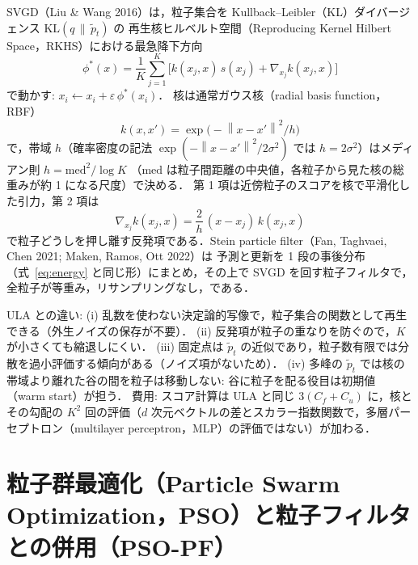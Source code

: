 \documentclass[a4paper,11pt]{article}
\newcommand{\ptil}{\tilde p_t}
\newcommand{\nrm}[1]{\left\lVert #1 \right\rVert}
\begin{document}
SVGD（Liu \& Wang 2016）は，粒子集合を Kullback--Leibler（KL）ダイバージェンス $\mathrm{KL}(q \,\|\, \ptil)$ の
再生核ヒルベルト空間（Reproducing Kernel Hilbert Space，RKHS）における最急降下方向
\begin{equation}
  \phi^*(x) = \frac1K \sum_{j=1}^K \Big[ k(x_j, x)\, s(x_j) + \nabla_{x_j} k(x_j, x) \Big]
  \label{eq:svgd}
\end{equation}
で動かす: $x_i \leftarrow x_i + \varepsilon\, \phi^*(x_i)$．
核は通常ガウス核（radial basis function，RBF）
\begin{equation}
  k(x, x') = \exp\!\big(-\nrm{x - x'}^2 / h\big)
\end{equation}
で，帯域 $h$（確率密度の記法 $\exp(-\nrm{x-x'}^2/2\sigma^2)$ では $h = 2\sigma^2$）はメディアン則 $h = \mathrm{med}^2 / \log K$
（$\mathrm{med}$ は粒子間距離の中央値，各粒子から見た核の総重みが約 1 になる尺度）で決める．
第 1 項は近傍粒子のスコアを核で平滑化した引力，第 2 項は
\begin{equation}
  \nabla_{x_j} k(x_j, x) = \frac{2}{h}\,(x - x_j)\, k(x_j, x)
\end{equation}
で粒子どうしを押し離す反発項である．Stein particle filter（Fan, Taghvaei, Chen 2021; Maken, Ramos, Ott 2022）は
予測と更新を 1 段の事後分布（式~\eqref{eq:energy} と同じ形）にまとめ，その上で SVGD を回す粒子フィルタで，
全粒子が等重み，リサンプリングなし，である．

ULA との違い: (i) 乱数を使わない決定論的写像で，粒子集合の関数として再生できる（外生ノイズの保存が不要）．
(ii) 反発項が粒子の重なりを防ぐので，$K$ が小さくても縮退しにくい．
(iii) 固定点は $\ptil$ の近似であり，粒子数有限では分散を過小評価する傾向がある（ノイズ項がないため）．
(iv) 多峰の $\ptil$ では核の帯域より離れた谷の間を粒子は移動しない: 谷に粒子を配る役目は初期値（warm start）が担う．
費用: スコア計算は ULA と同じ $3(C_f + C_u)$ に，核とその勾配の $K^2$ 回の評価（$d$ 次元ベクトルの差とスカラー指数関数で，多層パーセプトロン（multilayer perceptron，MLP）の評価ではない）が加わる．

\section{粒子群最適化（Particle Swarm Optimization，PSO）と粒子フィルタとの併用（PSO-PF）}
\end{document}
